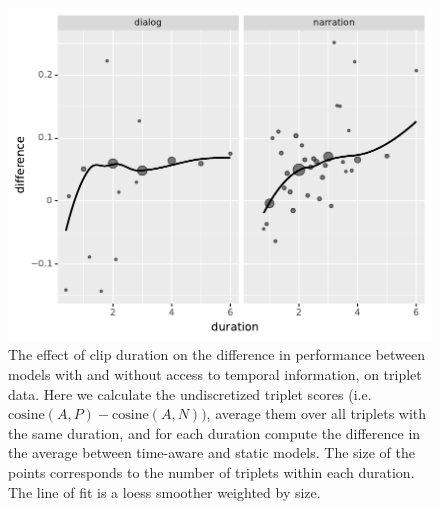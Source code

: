 \begin{figure}[htb]
  \centering
  \includegraphics[width=\columnwidth]{results/duration_effect.pdf}
  \caption{The effect of clip duration on the difference in
    performance between models with and without access to temporal
    information, on triplet data. Here we calculate the 
    undiscretized triplet scores (i.e.\ $\mathrm{cosine}(A, P) - \mathrm{cosine}(A,
    N))$, average them over all triplets with the same duration, and
    for each duration compute the difference in the average between
    time-aware and static models. The size of the points corresponds
    to the number of triplets within each duration. The line of fit is
    a {\sc loess} smoother weighted by size.}
  \label{fig:duration_effect}
\end{figure}

